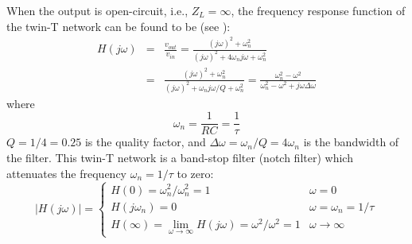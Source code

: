 \begin{itemize}
\end{itemize}

\begin{comment}

As these two $\pi$-networks are combined in parallel, they form a single
$\pi$-network with three branches $Z_1=Z'_1||Z''_1$, $Z_2=Z'_2||Z''_2$, 
and $Z_3=Z'_3||Z''_3$:
\[
Z_1=Z'_1||Z''_1=Z_2=Z'_2||Z''_2=\frac{1}{2}\left(R+\frac{1}{j\omega C}\right)
\]
\[
  Z_3=Z'_3||Z''_3=\frac{Z'_3 Z''_3}{Z'_3+Z''_3}
  =\frac{2R(1+j\omega RC)}{1+(j\omega RC)^2}
\]
The frequency response function of this $\pi$-network (a voltage divider) is:
\begin{eqnarray}
  H(j\omega)&=&\frac{Z_2}{Z_2+Z_3}=\frac{R+1/j\omega C}
  {R+1/j\omega C+4R(1+j\omega RC)/(1+(j\omega RC)^2)}
  \nonumber \\
  &=&\frac{(1+j\omega RC)/j\omega C}{(1+j\omega RC)/j\omega C+4R(1+j\omega RC)/(1+(j\omega RC)^2)}
  \nonumber \\
  &=&\frac{1/j\omega C}{1/j\omega C+4R/(1+(j\omega RC)^2)}
  =\frac{1}{1+4j\omega RC/(1+(j\omega RC)^2)}
  \nonumber \\
  &=&\frac{1+(j\omega\tau)^2}{1+(j\omega\tau)^2+4j\omega\tau}
  =\frac{(j\omega)^2+(1/\tau)^2}{(j\omega)^2+4j\omega/\tau+(1/\tau)^2}
  \nonumber
\end{eqnarray}

\end{comment}

When the output is open-circuit, i.e., $Z_L=\infty$, the frequency 
response function of the twin-T network can be found to be
(see ):
\begin{eqnarray}
H(j\omega)&=&\frac{v_{out}}{v_{in}}
=\frac{(j\omega)^2+\omega_n^2}{(j\omega)^2+4\omega_nj\omega+\omega_n^2}
\nonumber\\
&=&\frac{(j\omega)^2+\omega_n^2}{(j\omega)^2+\omega_nj\omega/Q+\omega_n^2}
=\frac{\omega_n^2-\omega^2}{\omega_n^2-\omega^2+j\omega\Delta\omega}
\nonumber
\end{eqnarray}
where
\[
\omega_n=\frac{1}{RC}=\frac{1}{\tau}
\]
$Q=1/4=0.25$ is the quality factor, and $\Delta\omega=\omega_n/Q=4\omega_n$ 
is the bandwidth of the filter. This twin-T network is a band-stop filter 
(notch filter) which attenuates the frequency $\omega_n=1/\tau$ to zero:
\[
|H(j\omega)|=\left\{\begin{array}{ll} 
H(0)=\omega_n^2/\omega_n^2=1 & \omega=0 \\
H(j\omega_n)=0 & \omega=\omega_n=1/\tau\\
H(\infty)=\lim\limits_{\omega\rightarrow\infty}H(j\omega)=\omega^2/\omega^2=1 & \omega\rightarrow \infty
\end{array}\right.
\]

